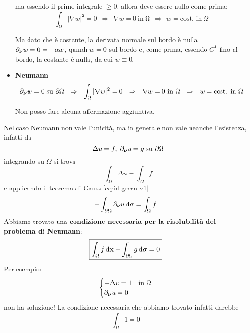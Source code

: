\begin{dimostrazione}
\begin{itemize}
              ma essendo il primo integrale $\displaystyle \geq 0$, allora deve essere nullo come prima:
              \begin{equation*}
                  \int _{\Omega }| \nabla w| ^{2} =0\ \ \Rightarrow \ \ \nabla w=0\ \text{in} \ \mathrm{\Omega } \ \ \Rightarrow \ \ w=\text{cost. in} \ \Omega
              \end{equation*}

              Ma dato che è costante, la derivata normale sul bordo è nulla $\displaystyle \partial_{\bm{\nu}} w=0=-\alpha w$, quindi $w=0$ sul bordo e, come prima, essendo $\displaystyle C^{1}$ fino al bordo, la costante è nulla, da cui $\displaystyle w\equiv 0$.
        \item \textbf{Neumann}
              \begin{equation*}
                  \partial_{\nuu} w=0\ \text{su} \ \partial \Omega \ \ \Rightarrow \ \ \int _{\Omega }| \nabla w| ^{2} =0\ \ \Rightarrow \ \ \nabla w=0\ \text{in} \ \mathrm{\Omega } \ \ \Rightarrow \ \ w=\text{cost. in} \ \Omega
              \end{equation*}

              Non posso fare alcuna affermazione aggiuntiva.
    \end{itemize}
\end{dimostrazione}
Nel caso Neumann non vale l'unicità, ma in generale non vale neanche l'esistenza, infatti da
\begin{equation*}
    -\Delta u=f,\ \partial _{\nuu} u=g\ \text{su} \ \partial \Omega
\end{equation*}
integrando su $\displaystyle \Omega $ si trova
\begin{equation*}
    -\int _{\Omega } \Delta u=\int _{\Omega } f
\end{equation*}
e applicando il teorema di Gauss \eqref{eq:id-green-v1}
\begin{equation*}
    -\int _{\partial \Omega } \partial_{\bm{\nu}} u\,\mathrm d \bm{\sigma} =\int _{\Omega } f
\end{equation*}
Abbiamo trovato una \textbf{condizione necessaria per la risolubilità del problema di Neumann}:
\begin{equation}
    \boxed{\int _{\Omega } f\,\mathrm d \mathbf{x}+\int _{\partial \Omega } g\,\mathrm d \bm{\sigma} =0}
\end{equation}
Per esempio:
\begin{equation*}
    \begin{cases}
        -\Delta u=1          & \text{in} \ \Omega \\
        \partial _{\bm{\nu}} u=0 &
    \end{cases}
\end{equation*}
non ha soluzione! La condizione necessaria che abbiamo trovato infatti darebbe
\begin{equation*}
    \int _{\Omega } 1=0
\end{equation*}
